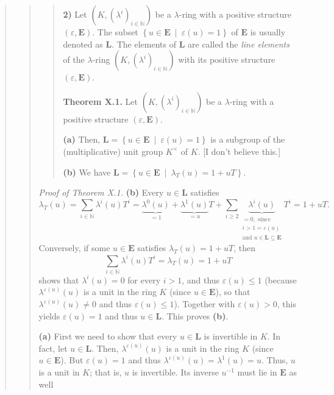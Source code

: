 \documentclass[12pt,final,notitlepage,onecolumn,german]{article}%
\begin{document}
\begin{quote}
\begin{quote}
\begin{quote}
\textbf{2)} Let $\left(  K,\left(  \lambda^{i}\right)  _{i\in\mathbb{N}%
}\right)  $ be a $\lambda$-ring with a positive structure $\left(
\varepsilon,\mathbf{E}\right)  .$ The subset $\left\{  u\in\mathbf{E}%
\ \mid\ \varepsilon\left(  u\right)  =1\right\}  $ of $\mathbf{E}$ is usually
denoted as $\mathbf{L}$. The elements of $\mathbf{L}$ are called the
\textit{line elements} of the $\lambda$-ring $\left(  K,\left(  \lambda
^{i}\right)  _{i\in\mathbb{N}}\right)  $ with its positive structure $\left(
\varepsilon,\mathbf{E}\right)  $.

\textbf{Theorem X.1.} Let $\left(  K,\left(  \lambda^{i}\right)
_{i\in\mathbb{N}}\right)  $ be a $\lambda$-ring with a positive structure
$\left(  \varepsilon,\mathbf{E}\right)  .$

\textbf{(a)} Then, $\mathbf{L}=\left\{  u\in\mathbf{E}\ \mid\ \varepsilon
\left(  u\right)  =1\right\}  $ is a subgroup of the (multiplicative) unit
group $K^{\times}$ of $K$. [I don't believe this.]

\textbf{(b)} We have $\mathbf{L}=\left\{  u\in\mathbf{E}\ \mid\ \lambda
_{T}\left(  u\right)  =1+uT\right\}  $.
\end{quote}

\textit{Proof of Theorem X.1.} \textbf{(b)} Every $u\in\mathbf{L}$ satisfies%
\[
\lambda_{T}\left(  u\right)  =\sum\limits_{i\in\mathbb{N}}\lambda^{i}\left(
u\right)  T^{i}=\underbrace{\lambda^{0}\left(  u\right)  }_{=1}+\underbrace
{\lambda^{1}\left(  u\right)  }_{=u}T+\sum\limits_{i\geq2}\underbrace
{\lambda^{i}\left(  u\right)  }_{\substack{=0,\text{ since}\\i>1=\varepsilon
\left(  u\right)  \\\text{and }u\in\mathbf{L}\subseteq\mathbf{E}}}T^{i}=1+uT.
\]
Conversely, if some $u\in\mathbf{E}$ satisfies $\lambda_{T}\left(  u\right)
=1+uT$, then%
\[
\sum\limits_{i\in\mathbb{N}}\lambda^{i}\left(  u\right)  T^{i}=\lambda
_{T}\left(  u\right)  =1+uT
\]
shows that $\lambda^{i}\left(  u\right)  =0$ for every $i>1$, and thus
$\varepsilon\left(  u\right)  \leq1$ (because $\lambda^{\varepsilon\left(
u\right)  }\left(  u\right)  $ is a unit in the ring $K$ (since $u\in
\mathbf{E}$), so that $\lambda^{\varepsilon\left(  u\right)  }\left(
u\right)  \neq0$ and thus $\varepsilon\left(  u\right)  \leq1$). Together with
$\varepsilon\left(  u\right)  >0$, this yields $\varepsilon\left(  u\right)
=1$ and thus $u\in\mathbf{L}$. This proves \textbf{(b)}.

\textbf{(a)} First we need to show that every $u\in\mathbf{L}$ is invertible
in $K$. In fact, let $u\in\mathbf{L}$. Then, $\lambda^{\varepsilon\left(
u\right)  }\left(  u\right)  $ is a unit in the ring $K$ (since $u\in
\mathbf{E}$). But $\varepsilon\left(  u\right)  =1$ and thus $\lambda
^{\varepsilon\left(  u\right)  }\left(  u\right)  =\lambda^{1}\left(
u\right)  =u$. Thus, $u$ is a unit in $K$; that is, $u$ is invertible. Its
inverse $u^{-1}$ must lie in $\mathbf{E}$ as well


\end{quote}
\end{quote}
\end{document}
